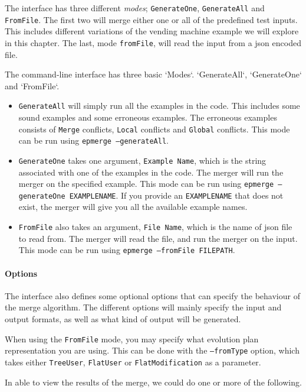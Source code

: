 \documentclass[a4paper,english]{ifimaster}
\begin{document}
The interface has three different \textit{modes}; \texttt{GenerateOne}, \texttt{GenerateAll} and \texttt{FromFile}. The first two will merge either one or all of the predefined test inputs. This includes different variations of the vending machine example we will explore in this chapter. The last, mode \texttt{fromFile}, will read the input from a json encoded file.

The command-line interface has three basic `Modes`. `GenerateAll`, `GenerateOne` and `FromFile`.

\begin{itemize}
\item \texttt{GenerateAll} will simply run all the examples in the code. This includes some sound examples and some erroneous examples. The erroneous examples consists of \texttt{Merge} conflicts, \texttt{Local} conflicts and \texttt{Global} conflicts. This mode can be run using \texttt{epmerge --generateAll}.
\item \texttt{GenerateOne} takes one argument, \texttt{Example Name}, which is the string associated with one of the examples in the code. The merger will run the merger on the specified example. This mode can be run using \texttt{epmerge --generateOne EXAMPLENAME}. If you provide an \texttt{EXAMPLENAME} that does not exist, the merger will give you all the available example names.
\item \texttt{FromFile} also takes an argument, \texttt{File Name}, which is the name of json file to read from. The merger will read the file, and run the merger on the input. This mode can be run using \texttt{epmerge --fromFile FILEPATH}.
\end{itemize}

\paragraph{Options}%
\label{par:options}

The interface also defines some optional options that can specify the behaviour of the merge algorithm. The different options will mainly specify the input and output formats, as well as what kind of output will be generated.

When using the \texttt{FromFile} mode, you may specify what evolution plan representation you are using. This can be done with the \texttt{--fromType} option, which takes either \texttt{TreeUser}, \texttt{FlatUser} or \texttt{FlatModification} as a parameter.

In able to view the results of the merge, we could do one or more of the following.
\end{document}
